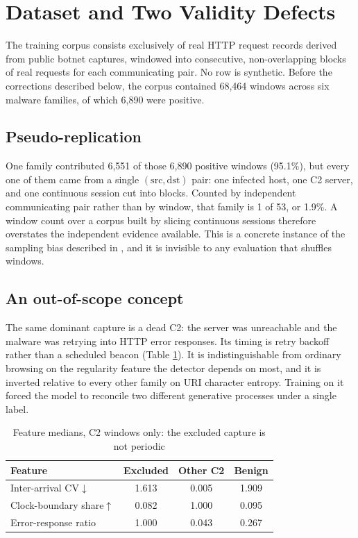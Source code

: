 \documentclass[conference,a4paper]{IEEEtran}
\begin{document}
\section{Dataset and Two Validity Defects}

The training corpus consists exclusively of real HTTP request records derived from public botnet captures, windowed into consecutive, non-overlapping blocks of real requests for each communicating pair. No row is synthetic. Before the corrections described below, the corpus contained 68{,}464 windows across six malware families, of which 6{,}890 were positive.

\subsection{Pseudo-replication}
One family contributed 6{,}551 of those 6{,}890 positive windows (95.1\%), but every one of them came from a single \((\mathrm{src}, \mathrm{dst})\) pair: one infected host, one C2 server, and one continuous session cut into blocks. Counted by independent communicating pair rather than by window, that family is 1 of 53, or 1.9\%. A window count over a corpus built by slicing continuous sessions therefore overstates the independent evidence available. This is a concrete instance of the sampling bias described in \cite{arp2022dos, pendlebury2019tesseract}, and it is invisible to any evaluation that shuffles windows.

\subsection{An out-of-scope concept}
The same dominant capture is a dead C2: the server was unreachable and the malware was retrying into HTTP error responses. Its timing is retry backoff rather than a scheduled beacon (Table \ref{tab:scope}). It is indistinguishable from ordinary browsing on the regularity feature the detector depends on most, and it is inverted relative to every other family on URI character entropy. Training on it forced the model to reconcile two different generative processes under a single label.

\begin{table}[t]
\caption{Feature medians, C2 windows only: the excluded capture is not periodic}
\label{tab:scope}
\centering
\small
\begin{tabular}{lccc}
\toprule
\textbf{Feature} & \textbf{Excluded} & \textbf{Other C2} & \textbf{Benign} \\
\midrule
Inter-arrival CV$\downarrow$ & 1.613 & 0.005 & 1.909 \\
Clock-boundary share$\uparrow$ & 0.082 & 1.000 & 0.095 \\
Error-response ratio & 1.000 & 0.043 & 0.267 \\
\bottomrule
\end{tabular}
\end{table}
\end{document}
